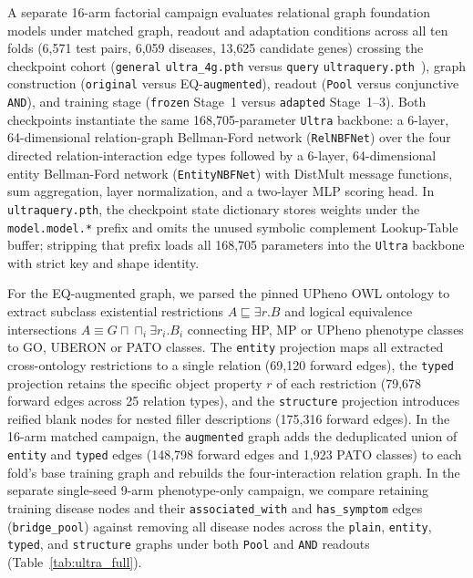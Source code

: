 \documentclass{article}
\begin{document}
A separate 16-arm factorial campaign evaluates relational graph foundation
models under matched graph, readout and adaptation conditions across all ten folds
(6{,}571 test pairs, 6{,}059 diseases, 13{,}625 candidate genes) crossing the
checkpoint cohort (\texttt{general} \texttt{ultra\_4g.pth} versus
\texttt{query} \texttt{ultraquery.pth}~\cite{ultra,galkin2024ultraquery}),
graph construction (\texttt{original} versus EQ-\texttt{augmented}), readout
(\texttt{Pool} versus conjunctive \texttt{AND}), and training stage
(\texttt{frozen} Stage~1 versus \texttt{adapted} Stage~1--3). Both checkpoints
instantiate the same 168{,}705-parameter \texttt{Ultra} backbone: a 6-layer,
64-dimensional relation-graph Bellman-Ford network (\texttt{RelNBFNet}) over the
four directed relation-interaction edge types followed by a 6-layer,
64-dimensional entity Bellman-Ford network (\texttt{EntityNBFNet}) with DistMult
message functions, sum aggregation, layer normalization, and a two-layer MLP
scoring head. In \texttt{ultraquery.pth}, the checkpoint state dictionary stores
weights under the \texttt{model.model.*} prefix and omits the unused symbolic
complement Lookup-Table buffer; stripping that prefix loads all 168{,}705
parameters into the \texttt{Ultra} backbone with strict key and shape identity.

For the EQ-augmented graph, we parsed the pinned UPheno OWL ontology to extract
subclass existential restrictions $A \sqsubseteq \exists r.B$ and logical
equivalence intersections $A \equiv G \sqcap \sqcap_i \exists r_i.B_i$
connecting HP, MP or UPheno phenotype classes to GO, UBERON or PATO classes. The
\texttt{entity} projection maps all extracted cross-ontology restrictions to a
single relation (69{,}120 forward edges), the \texttt{typed} projection retains
the specific object property $r$ of each restriction (79{,}678 forward edges
across 25 relation types), and the \texttt{structure} projection introduces
reified blank nodes for nested filler descriptions (175{,}316 forward edges).
In the 16-arm matched campaign, the \texttt{augmented} graph adds the deduplicated
union of \texttt{entity} and \texttt{typed} edges (148{,}798 forward edges and
1{,}923 PATO classes) to each fold's base training graph and rebuilds the
four-interaction relation graph. In the separate single-seed 9-arm phenotype-only campaign,
we compare retaining training disease nodes and their \texttt{associated\_with}
and \texttt{has\_symptom} edges (\texttt{bridge\_pool}) against removing all
disease nodes across the \texttt{plain}, \texttt{entity}, \texttt{typed}, and
\texttt{structure} graphs under both \texttt{Pool} and \texttt{AND} readouts
(Table~\ref{tab:ultra_full}).
\end{document}
